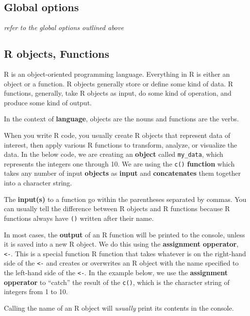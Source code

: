\documentclass[
]{book}
\begin{document}
\hypertarget{global-options-1}{%
\subsection{Global options}\label{global-options-1}}

\emph{refer to the global options outlined above}

\hypertarget{r-objects-functions}{%
\subsection*{R objects, Functions}\label{r-objects-functions}}

R is an object-oriented programming language. Everything in R is either an object or a function. R objects generally store or define some kind of data. R functions, generally, take R objects as input, do some kind of operation, and produce some kind of output.

In the context of \textbf{language}, objects are the nouns and functions are the verbs.

When you write R code, you usually create R objects that represent data of interest, then apply various R functions to transform, analyze, or visualize the data. In the below code, we are creating an \textbf{object} called \texttt{my\_data}, which represents the integers one through 10. We are using the \texttt{c()} \textbf{function} which takes any number of input \textbf{objects} as \textbf{input} and \textbf{concatenates} them together into a character string.

The \textbf{input(s)} to a function go within the parentheses separated by commas. You can usually tell the difference between R objects and R functions because R functions always have \texttt{()} written after their name.

In most cases, the \textbf{output} of an R function will be printed to the console, unless it is saved into a new R object. We do this using the \textbf{assignment opperator}, \texttt{\textless{}-}. This is a special function R function that takes whatever is on the right-hand side of the \texttt{\textless{}-} and creates or overwrites an R object with the name specified to the left-hand side of the \texttt{\textless{}-}. In the example below, we use the \textbf{assignment opperator} to ``catch'' the result of the \texttt{c()}, which is the character string of integers from 1 to 10.

Calling the name of an R object will \emph{usually} print its contents in the console.
\end{document}
